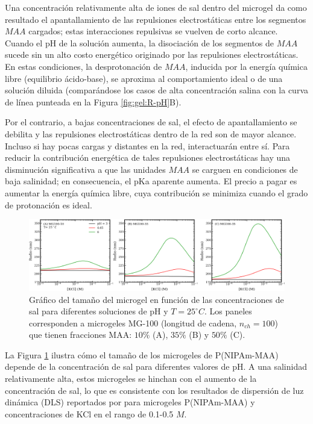 Una concentraci\'on relativamente alta de iones de sal dentro del microgel da como resultado el apantallamiento de las repulsiones electrost\'aticas entre los segmentos $MAA$ cargados; estas interacciones repulsivas se vuelven de corto alcance.
Cuando el pH de la soluci\'on aumenta, la disociaci\'on de los segmentos de $MAA$ sucede sin un alto costo energ\'etico originado por las repulsiones electrost\'aticas.
En estas condiciones, la desprotonaci\'on de $MAA$, inducida por la energ\'ia qu\'imica libre (equilibrio \'acido-base), se aproxima al comportamiento ideal o de una soluci\'on diluida (compar\'andose los casos de alta concentraci\'on salina con la curva de l\'inea punteada en la Figura \ref{fig:gel:R-pH}B).

Por el contrario, a bajas concentraciones de sal, el efecto de apantallamiento se debilita y las repulsiones electrost\'aticas dentro de la red son de mayor alcance.
Incluso si hay pocas cargas y distantes en la red, interactuar\'an entre s\'i.
Para reducir la contribuci\'on energ\'etica de tales repulsiones electrost\'aticas hay una disminuci\'on significativa a que las unidades $MAA$ se carguen en condiciones de baja salinidad;
en consecuencia, el pKa aparente aumenta.
El precio a pagar es aumentar la energ\'ia qu\'imica libre, cuya contribuci\'on se minimiza cuando el grado de protonaci\'on es ideal.




\begin{figure}[!htb]
	\centering
	\includegraphics[width=0.99\linewidth]{Figures/graph-gel/R-cs.pdf}
	\caption{Gr\'afico del tama\~no del microgel en funci\'on de las concentraciones de sal para diferentes soluciones de pH y $T=25 ^\circ C$.
		Los paneles corresponden a microgeles MG-100 (longitud de cadena, $n_{ch}=100$) que tienen fracciones MAA: $10\%$ (A), $35\%$ (B) y $50\%$ (C).}
	\label{fig:gel:R-cs}
\end{figure}


La Figura \ref{fig:gel:R-cs} ilustra c\'omo el tama\~no de los microgeles de P(NIPAm-MAA) depende de la concentraci\'on de sal para diferentes valores de pH.
A una salinidad relativamente alta, estos microgeles se hinchan con el aumento de la concentraci\'on de sal, lo que es consistente con los resultados de dispersi\'on de luz din\'amica (DLS) reportados por \citet{Wong2009} para microgeles P(NIPAm-MAA) y concentraciones de KCl en el rango de 0.1-0.5 $M$.


